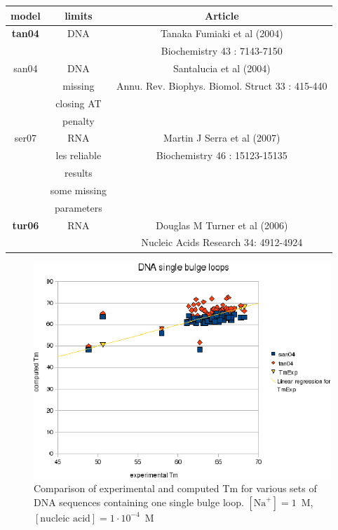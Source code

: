 \documentclass{article}
\begin{document}
\begin{table}[h][c]
\begin{tabular}[h]{| c | c | c |}
\textbf{model} & \textbf{limits} & \textbf{Article} \\
\hline
\textbf{tan04} & DNA & Tanaka Fumiaki et al (2004)\\
 & & Biochemistry 43 : 7143-7150 \\
\hline
san04 & DNA & Santalucia et al (2004)\\
 & missing & Annu. Rev. Biophys. Biomol. Struct 33 : 415-440\\
 & closing AT & \\
 & penalty & \\
 \hline
ser07 & RNA & Martin J Serra et al (2007)\\
 & les reliable & Biochemistry 46 : 15123-15135 \\
 & results & \\
 & some missing & \\
 & parameters & \\
 \hline
\textbf{tur06} & RNA & Douglas M Turner et al (2006)\\
 & & Nucleic Acids Research 34: 4912-4924 \\
\hline
\end{tabular}
\end{table}

\begin{figure}[h]
\includegraphics[width=1\linewidth]{images/DNASingleBulgeLoop}
\caption{Comparison of experimental and computed Tm for various sets of DNA sequences containing one single bulge loop. $[\mbox{Na}^+] = 1$~M, $[\mbox{nucleic acid}] = 1\cdot{}10^{-4}$~M}
\end{figure}
\end{document}
